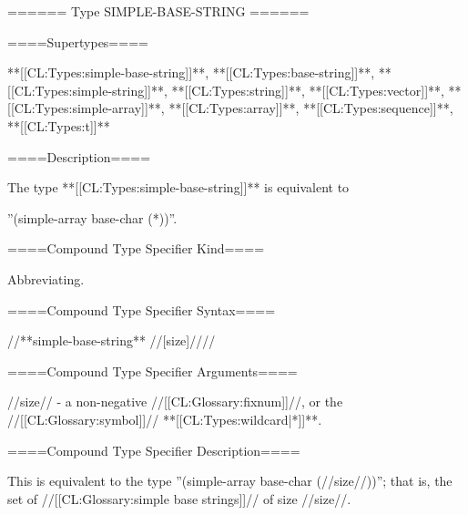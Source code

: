 ====== Type SIMPLE-BASE-STRING ======

====Supertypes====

**[[CL:Types:simple-base-string]]**, **[[CL:Types:base-string]]**, **[[CL:Types:simple-string]]**, **[[CL:Types:string]]**, **[[CL:Types:vector]]**, **[[CL:Types:simple-array]]**, **[[CL:Types:array]]**, **[[CL:Types:sequence]]**, **[[CL:Types:t]]**

====Description====

The type **[[CL:Types:simple-base-string]]** is equivalent to

''(simple-array base-char (*))''.

====Compound Type Specifier Kind====

Abbreviating.

====Compound Type Specifier Syntax====

//**simple-base-string** //[size]////

====Compound Type Specifier Arguments====

//size// - a non-negative //[[CL:Glossary:fixnum]]//, or the //[[CL:Glossary:symbol]]// **[[CL:Types:wildcard|*]]**.

====Compound Type Specifier Description====

This is equivalent to the type ''(simple-array base-char (//size//))''; that is, the set of //[[CL:Glossary:simple base strings]]// of size //size//.

  
